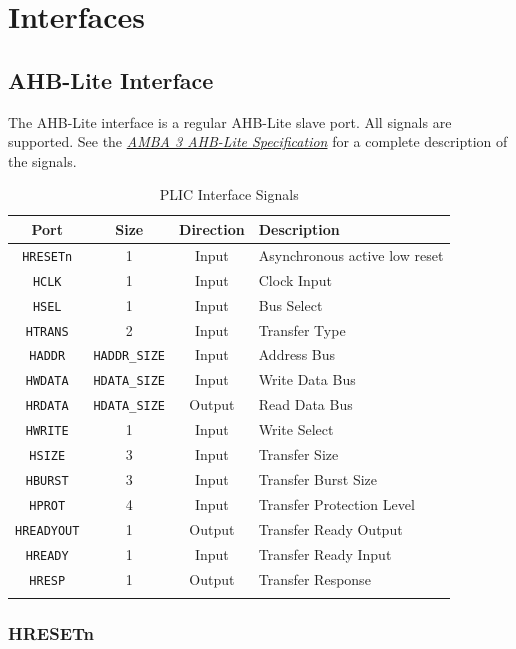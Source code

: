 \chapter{Interfaces}

\section{AHB-Lite Interface}

The AHB-Lite interface is a regular AHB-Lite slave port. All signals are
supported. See the
\emph{\href{https://www.arm.com/products/system-ip/amba-specifications}{AMBA
		3 AHB-Lite Specification}} for a complete description of the signals.

\begin{longtable}[c]{@{\extracolsep{\fill}}cccl@{}}	
	\toprule 
	\textbf{Port} & \textbf{Size} & \textbf{Direction} & \textbf{Description}\\
	\midrule
	\endhead 
	\texttt{HRESETn}   & 1 & Input  & Asynchronous active low reset\\
	\texttt{HCLK}      & 1 & Input  & Clock Input\\
	\texttt{HSEL}      & 1 & Input  & Bus Select\\
	\texttt{HTRANS}    & 2 & Input  & Transfer Type\\
	\texttt{HADDR}     & \texttt{HADDR\_SIZE} & Input & Address Bus\\
	\texttt{HWDATA}    & \texttt{HDATA\_SIZE} & Input & Write Data Bus\\
	\texttt{HRDATA}    & \texttt{HDATA\_SIZE} & Output & Read Data Bus\\
	\texttt{HWRITE}    & 1 & Input  & Write Select\\
	\texttt{HSIZE}     & 3 & Input  & Transfer Size\\
	\texttt{HBURST}    & 3 & Input  & Transfer Burst Size\\
	\texttt{HPROT}     & 4 & Input  & Transfer Protection Level\\
	\texttt{HREADYOUT} & 1 & Output & Transfer Ready Output\\
	\texttt{HREADY}    & 1 & Input  & Transfer Ready Input\\
	\texttt{HRESP}     & 1 & Output & Transfer Response\\
	\bottomrule 	
	\caption{PLIC Interface Signals}
	\label{tab:AHBIF}
\end{longtable}

\subsection{HRESETn}

